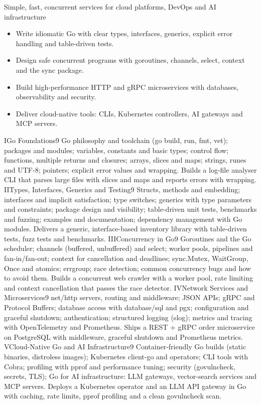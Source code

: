 {Simple, fast, concurrent services for cloud platforms, DevOps and AI infrastructure}

\begin{itemize}
\item Write idiomatic Go with clear types, interfaces, generics, explicit error handling and table-driven tests.
\item Design safe concurrent programs with goroutines, channels, select, context and the sync package.
\item Build high-performance HTTP and gRPC microservices with databases, observability and security.
\item Deliver cloud-native tools: CLIs, Kubernetes controllers, AI gateways and MCP servers.
\end{itemize}

\unit{I}{Go Foundations}{9}{%
Go philosophy and toolchain (go build, run, fmt, vet); packages and modules; variables, constants and basic types;
control flow; functions, multiple returns and closures; arrays, slices and maps; strings, runes and UTF-8;
pointers; explicit error values and wrapping.}
{Builds a log-file analyser CLI that parses large files with slices and maps and reports errors with wrapping.}
\unit{II}{Types, Interfaces, Generics and Testing}{9}{%
Structs, methods and embedding; interfaces and implicit satisfaction; type switches; generics with type parameters and constraints;
package design and visibility; table-driven unit tests, benchmarks and fuzzing; examples and documentation;
dependency management with Go modules.}
{Delivers a generic, interface-based inventory library with table-driven tests, fuzz tests and benchmarks.}
\unit{III}{Concurrency in Go}{9}{%
Goroutines and the Go scheduler; channels (buffered, unbuffered) and select; worker pools, pipelines and fan-in/fan-out;
context for cancellation and deadlines; sync.Mutex, WaitGroup, Once and atomics; errgroup;
race detection; common concurrency bugs and how to avoid them.}
{Builds a concurrent web crawler with a worker pool, rate limiting and context cancellation that passes the race detector.}
\unit{IV}{Network Services and Microservices}{9}{%
net/http servers, routing and middleware; JSON APIs; gRPC and Protocol Buffers; database access with database/sql and pgx;
configuration and graceful shutdown; authentication; structured logging (slog); metrics and tracing with OpenTelemetry and Prometheus.}
{Ships a REST + gRPC order microservice on PostgreSQL with middleware, graceful shutdown and Prometheus metrics.}
\unit{V}{Cloud-Native Go and AI Infrastructure}{9}{%
Container-friendly Go builds (static binaries, distroless images); Kubernetes client-go and operators;
CLI tools with Cobra; profiling with pprof and performance tuning; security (govulncheck, secrets, TLS);
Go for AI infrastructure: LLM gateways, vector-search services and MCP servers.}
{Deploys a Kubernetes operator and an LLM API gateway in Go with caching, rate limits, pprof profiling and a clean govulncheck scan.}

